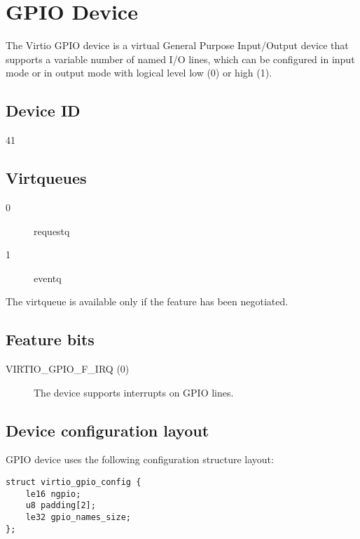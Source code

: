 \section{GPIO Device}\label{sec:Device Types / GPIO Device}

The Virtio GPIO device is a virtual General Purpose Input/Output device that
supports a variable number of named I/O lines, which can be configured in input
mode or in output mode with logical level low (0) or high (1).

\subsection{Device ID}\label{sec:Device Types / GPIO Device / Device ID}
41

\subsection{Virtqueues}\label{sec:Device Types / GPIO Device / Virtqueues}

\begin{description}
\item[0] requestq
\item[1] eventq
\end{description}

The  virtqueue is available only if the 
feature has been negotiated.

\subsection{Feature bits}\label{sec:Device Types / GPIO Device / Feature bits}

\begin{description}
\item[VIRTIO_GPIO_F_IRQ (0)] The device supports interrupts on GPIO lines.
\end{description}

\subsection{Device configuration layout}\label{sec:Device Types / GPIO Device / Device configuration layout}

GPIO device uses the following configuration structure layout:

\begin{lstlisting}
struct virtio_gpio_config {
    le16 ngpio;
    u8 padding[2];
    le32 gpio_names_size;
};
\end{lstlisting}

